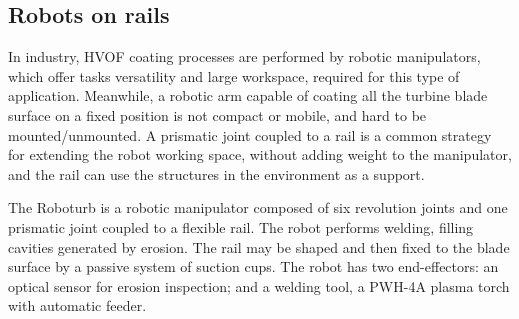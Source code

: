 \subsection{Robots on rails}\label{sec::rail}
In industry, HVOF coating processes are performed by robotic manipulators,
which offer tasks versatility and large workspace, required for this
type of application. Meanwhile, a robotic arm capable of coating all the turbine
blade surface on a fixed position is not compact or mobile, and hard to be
mounted/unmounted. A prismatic joint coupled to a rail is a common strategy for
extending the robot working space, without adding weight to the manipulator,
and the rail can use the structures in the environment as a support.





The Roboturb \citep{roboturb} is a robotic manipulator composed of six
revolution joints and one prismatic joint coupled to a flexible rail.
The robot performs welding, filling cavities generated by erosion. The rail
may be shaped and then fixed to the blade surface by a passive system of
suction cups. The robot has two end-effectors: an optical sensor for erosion
inspection; and a welding tool, a PWH-4A plasma torch with automatic feeder.


